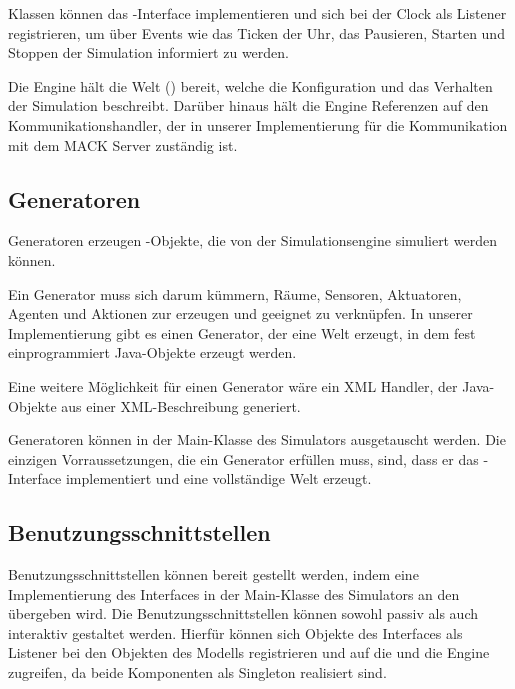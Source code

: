 Klassen können das -Interface implementieren und sich bei der Clock als Listener registrieren, um über Events wie das Ticken der Uhr, das Pausieren, Starten und Stoppen der Simulation informiert zu werden.

Die Engine hält die Welt () bereit, welche die Konfiguration und das Verhalten der Simulation beschreibt. Darüber hinaus hält die Engine Referenzen auf den Kommunikationshandler, der in unserer Implementierung für die Kommunikation mit dem MACK Server zuständig ist.

\subsection{Generatoren}\label{subsec:concept_generators}
Generatoren erzeugen -Objekte, die von der Simulationsengine simuliert werden können.

Ein Generator muss sich darum kümmern, Räume, Sensoren, Aktuatoren, Agenten und Aktionen zur erzeugen und geeignet zu verknüpfen. In unserer Implementierung gibt es einen Generator, der eine Welt erzeugt, in dem fest einprogrammiert Java-Objekte erzeugt werden.

Eine weitere Möglichkeit für einen Generator wäre ein XML Handler, der Java-Objekte aus einer XML-Beschreibung generiert.

Generatoren können in der Main-Klasse des Simulators ausgetauscht werden. Die einzigen Vorraussetzungen, die ein Generator erfüllen muss, sind, dass er das -Interface implementiert und eine vollständige Welt erzeugt.


\subsection{Benutzungsschnittstellen}\label{subsec:concept_interfaces}
Benutzungsschnittstellen können bereit gestellt werden, indem eine Implementierung des Interfaces  in der Main-Klasse des Simulators an den  übergeben wird. Die Benutzungsschnittstellen können sowohl passiv als auch interaktiv gestaltet werden. Hierfür können sich Objekte des Interfaces als Listener bei den Objekten des Modells registrieren und auf die  und die Engine zugreifen, da beide Komponenten als Singleton realisiert sind.

